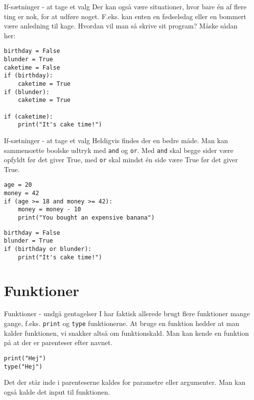 \documentclass[main.tex]{subfiles}
\begin{document}
\begin{frame}[fragile]{If-sætninger - at tage et valg}
	Der kan også være situationer, hvor bare én af flere ting er nok, for at udføre noget. F.eks. kan enten en fødselsdag eller en bommert være anledning til kage. Hvordan vil man så skrive sit program? Måske sådan her:
	\begin{lstlisting}[style=python]
birthday = False
blunder = True
caketime = False
if (birthday):
	caketime = True
if (blunder):
	caketime = True
	
if (caketime):
	print("It's cake time!")
	\end{lstlisting}
\end{frame}


\begin{frame}[fragile]{If-sætninger - at tage et valg}
	Heldigvis findes der en bedre måde. Man kan sammensætte boolske udtryk med \texttt{and} og \texttt{or}. Med \texttt{and} skal begge sider være opfyldt før det giver True, med \texttt{or} skal mindst én side være True før det giver True.
	\begin{lstlisting}[style=python]
age = 20
money = 42
if (age >= 18 and money >= 42):
	money = money - 10
	print("You bought an expensive banana")
	\end{lstlisting}
	
	\begin{lstlisting}[style=python]
birthday = False
blunder = True
if (birthday or blunder):
	print("It's cake time!")
	\end{lstlisting}
\end{frame}





\section{Funktioner}

\begin{frame}[fragile]{Funktioner - undgå gentagelser}
	I har faktisk allerede brugt flere funktioner mange gange, f.eks. \texttt{print} og \texttt{type} funktionerne. At bruge en funktion hedder at man kalder funktionen, vi snakker altså om funktionskald. Man kan kende en funktion på at der er parenteser efter navnet.
	
	\begin{lstlisting}[style=python]
print("Hej")
type("Hej")
	\end{lstlisting}
	
	Det der står inde i parenteserne kaldes for parametre eller argumenter. Man kan også kalde det input til funktionen.
\end{frame}
\end{document}
